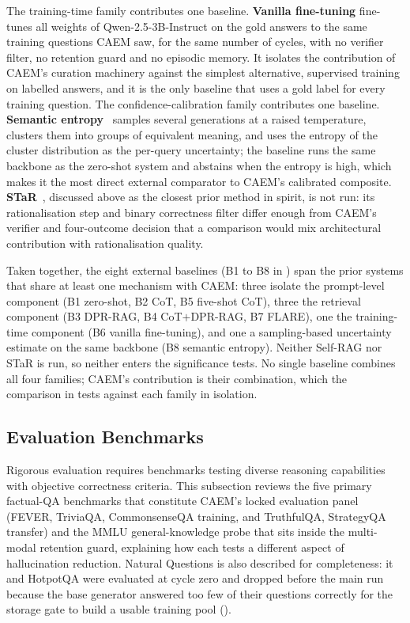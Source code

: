 The training-time family contributes one baseline. \textbf{Vanilla fine-tuning} fine-tunes all weights of Qwen-2.5-3B-Instruct on the gold answers to the same training questions CAEM saw, for the same number of cycles, with no verifier filter, no retention guard and no episodic memory. It isolates the contribution of CAEM's curation machinery against the simplest alternative, supervised training on labelled answers, and it is the only baseline that uses a gold label for every training question. The confidence-calibration family contributes one baseline. \textbf{Semantic entropy}~\cite{farquhar2024semantic} samples several generations at a raised temperature, clusters them into groups of equivalent meaning, and uses the entropy of the cluster distribution as the per-query uncertainty; the baseline runs the same backbone as the zero-shot system and abstains when the entropy is high, which makes it the most direct external comparator to CAEM's calibrated composite. \textbf{STaR}~\cite{NEURIPS2022_639a9a17}, discussed above as the closest prior method in spirit, is not run: its rationalisation step and binary correctness filter differ enough from CAEM's verifier and four-outcome decision that a comparison would mix architectural contribution with rationalisation quality.

Taken together, the eight external baselines (B1 to B8 in ) span the prior systems that share at least one mechanism with CAEM: three isolate the prompt-level component (B1 zero-shot, B2 CoT, B5 five-shot CoT), three the retrieval component (B3 DPR-RAG, B4 CoT$+$DPR-RAG, B7 FLARE), one the training-time component (B6 vanilla fine-tuning), and one a sampling-based uncertainty estimate on the same backbone (B8 semantic entropy). Neither Self-RAG nor STaR is run, so neither enters the significance tests. No single baseline combines all four families; CAEM's contribution is their combination, which the comparison in  tests against each family in isolation.

\subsection{Evaluation Benchmarks}

Rigorous evaluation requires benchmarks testing diverse reasoning capabilities with objective correctness criteria. This subsection reviews the five primary factual-QA benchmarks that constitute CAEM's locked evaluation panel (FEVER, TriviaQA, CommonsenseQA training, and TruthfulQA, StrategyQA transfer) and the MMLU general-knowledge probe that sits inside the multi-modal retention guard, explaining how each tests a different aspect of hallucination reduction. Natural Questions is also described for completeness: it and HotpotQA were evaluated at cycle zero and dropped before the main run because the base generator answered too few of their questions correctly for the storage gate to build a usable training pool ().

